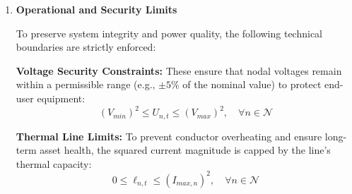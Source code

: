 \documentclass[preprint,12pt]{elsarticle}
\begin{document}
\begin{enumerate}
    The physical relationship governing the voltage drop between a parent node $m =\pi_n$ and its child node $n$ is represented by:
        \begin{equation}
        U_{m,t} - U_{n,t} = 2(r_n P_{n,t} + x_n Q_{n,t}) - (r_n^2 + x_n^2) \ell_{n,t}
        \label{eq:voltage_drop}
        \end{equation}
    The fundamental definition of the squared current magnitude, $\ell_{n,t} = \frac{P_{n,t}^2 + Q_{n,t}^2}{U_{m,t}}$, introduces a non-convex quadratic equality. To maintain tractability, this is relaxed into a convex inequality:
        \begin{equation}
        P_{n,t}^2 + Q_{n,t}^2 \le U_{m,t} \cdot \ell_{n,t}
        \label{eq:socp_relaxation}
        \end{equation}
    For radial distribution networks, it has been theoretically established that the SOCP relaxation is exact under mild conditions, specifically when nodal power injections are not excessively high in the reverse direction and the objective function strictly increases with respect to branch power losses. As the proposed objective function includes a penalty for line currents and minimizes total operational costs, the optimal solution is naturally driven to the boundary of the second-order cone, thereby ensuring that the relaxation is tight.
        
    For implementation in high-performance solvers, this relaxation is rewritten in the standard rotated second-order cone format:
    \begin{equation}
        \begin{Vmatrix} 2P_{n,t} \\ 2Q_{n,t} \\ U_{m,t} - \ell_{n,t} \end{Vmatrix}_2 \le U_{m,t} + \ell_{n,t}
        \label{eq:socp_format}
    \end{equation}

    \item \textbf{Operational and Security Limits}
    
    To preserve system integrity and power quality, the following technical boundaries are strictly enforced:
    
    \textbf{Voltage Security Constraints:} These ensure that nodal voltages remain within a permissible range (e.g., $\pm 5\%$ of the nominal value) to protect end-user equipment:
    \begin{equation}
    (V_{min})^2 \le U_{n,t} \le (V_{max})^2, \quad \forall n \in \mathcal{N}
    \label{eq:voltage_limitss}
    \end{equation}
    
    \textbf{Thermal Line Limits:} To prevent conductor overheating and ensure long-term asset health, the squared current magnitude is capped by the line's thermal capacity:
    \begin{equation}
    0 \le \ell_{n,t} \le (I_{max,n})^2, \quad \forall n \in \mathcal{N}
    \label{eq:line_limits}
    \end{equation}
    \end{enumerate}
    
\end{document}
